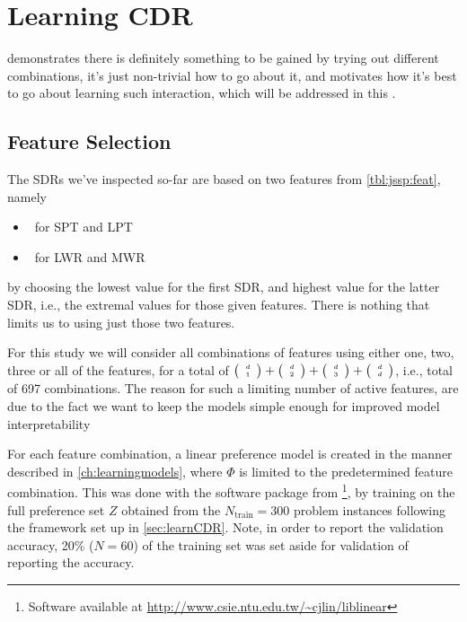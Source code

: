 \documentclass[smallextended]{svjour3}
\begin{document}
\section{Learning CDR}\label{ch:expr:CDR}
 demonstrates there is definitely something to be gained by
trying out different combinations, it's just non-trivial how to go about it,
and motivates how it's best to go about learning such interaction, which will
be addressed in this .

\subsection{Feature Selection}
The SDRs we've inspected so-far are based on two features from
\cref{tbl:jssp:feat}, namely
\begin{itemize}
	\item \phiproc\ for SPT and LPT 
	\item \phijobWrm\ for LWR and MWR 
\end{itemize}
by choosing the lowest value for the first SDR, and highest value for the 
latter SDR, i.e., the extremal values for those given features. 
There is nothing that limits us to using just those two features. 

For this study we will consider all combinations of features using either one,
two, three or all of the features, for a total of
$\tiny \left(\begin{array}{c}d\\1\end{array}\right)+\tiny \left(\begin{array}{c}d\\2\end{array}\right)+\tiny \left(\begin{array}{c}d\\3\end{array}\right)+\tiny \left(\begin{array}{c}d\\d\end{array}\right)$, i.e., total
of 697 combinations. The reason for such a limiting number of active features,
are due to the fact we want to keep the models simple enough for improved model
interpretability

For each feature combination, a linear preference model is created in the
manner described in \cref{ch:learningmodels}, where $\Phi$ is limited to the
predetermined feature combination. This was done with the software package from
\cite{liblinear}\footnote{Software available at 
	\url{http://www.csie.ntu.edu.tw/~cjlin/liblinear}},
by training on the full preference set $Z$ obtained from the
$N_{\text{train}}=300$ problem instances following the framework set up in
\cref{sec:learnCDR}. 
Note, in order to report the validation accuracy, 20\% ($N=60$) of the training 
set was set aside for validation of reporting the accuracy.
\end{document}
